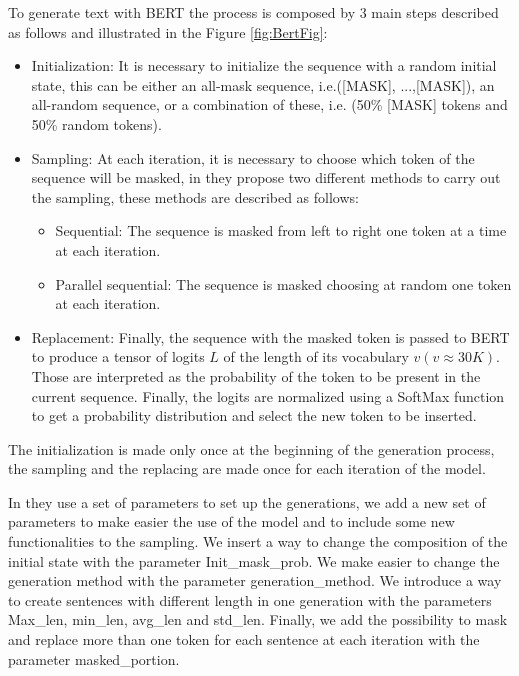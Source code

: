 \documentclass[10pt,twocolumn,letterpaper]{article}
\begin{document}
To generate text with BERT the process is composed by 3 main steps described as follows and illustrated in the Figure \ref{fig:BertFig}:

\begin{itemize}
\item Initialization: It is necessary to initialize the sequence with a random initial state, this can be either an all-mask sequence,
i.e.([MASK], ...,[MASK]), an all-random sequence, or a combination of these, i.e. (50\% [MASK] tokens and 50\% random tokens).
\item Sampling: At each iteration, it is necessary to choose which token of the sequence will be masked, in \cite{wang2019bert}
they propose two different methods to carry out the sampling, these methods are described as follows:
\begin{itemize}
   \item Sequential: The sequence is masked from left to right one token at a time at each iteration.
   \item Parallel sequential: The sequence is masked choosing at random one token at each iteration.
\end{itemize}
\item Replacement: Finally, the sequence with the masked token is passed to BERT to produce a tensor of logits $L$ of
the length of its vocabulary $v (v \approx 30K)$. Those are interpreted as the probability of the token to be present in the current sequence.
Finally, the logits are normalized using a SoftMax function to get a probability distribution and select the new token to be inserted.
\end{itemize}

The initialization is made only once at the beginning of the generation process, the sampling and the replacing are
made once for each iteration of the model.

In \cite{wang2019bert} they use a set of parameters to set up the generations,
we add a new set of parameters to make easier the use of the model and
to include some new functionalities to the sampling. We insert a way to
change the composition of the initial state with the parameter Init_mask_prob.
We make easier to change the generation method with the parameter generation_method.
We introduce a way to create sentences with different length in one generation with the parameters Max_len,
min_len, avg_len and std_len. Finally, we add the possibility to mask and replace more
than one token for each sentence at each iteration with the parameter masked_portion.
\end{document}
